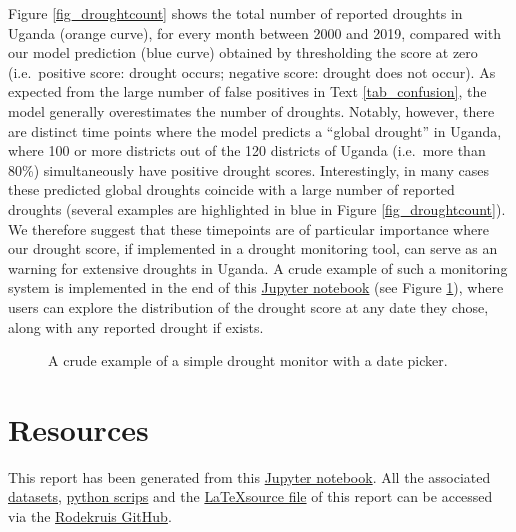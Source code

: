 \documentclass[10pt,parskip=half,
toc=sectionentrywithdots,
bibliography=totocnumbered,
captions=tableheading,numbers=noendperiod]{scrartcl}
\begin{document}
Figure \ref{fig_droughtcount} shows the total number of reported
droughts in Uganda (orange curve), for every month between 2000 and
2019, compared with our model prediction (blue curve) obtained by
thresholding the score at zero (i.e.~positive score: drought occurs;
negative score: drought does not occur). As expected from the large
number of false positives in Text \ref{tab_confusion}, the model
generally overestimates the number of droughts. Notably, however, there
are distinct time points where the model predicts a ``global drought''
in Uganda, where 100 or more districts out of the 120 districts of
Uganda (i.e.~more than 80\%) simultaneously have positive drought
scores. Interestingly, in many cases these predicted global droughts
coincide with a large number of reported droughts (several examples are
highlighted in blue in Figure \ref{fig_droughtcount}). We therefore
suggest that these timepoints are of particular importance where our
drought score, if implemented in a drought monitoring tool, can serve as
an warning for extensive droughts in Uganda. A crude example of such a
monitoring system is implemented in the end of this
\href{https://github.com/rodekruis/Drought_IBF/blob/master/Model\%20Event\%20Data/Uganda_logit_model.ipynb}{Jupyter
notebook} (see Figure \ref{fig_monitor}), where users can explore the
distribution of the drought score at any date they chose, along with any
reported drought if exists.

\begin{figure}[H]
\hypertarget{fig_monitor}{%
\begin{center}
\end{center}
\caption{A crude example of a simple drought monitor with a date picker.}\label{fig_monitor}
}
\end{figure}

\hypertarget{resources}{%
\section{Resources}\label{resources}}

This report has been generated from this
\href{https://github.com/rodekruis/Drought_IBF/blob/master/Model\%20Event\%20Data/Uganda_logit_model.ipynb}{Jupyter
notebook}. All the associated
\href{https://github.com/rodekruis/Drought_IBF/tree/master/Model\%20Event\%20Data/datasets}{datasets},
\href{https://github.com/rodekruis/Drought_IBF/blob/master/Model\%20Event\%20Data/drought_ibf_utility.py}{python
scrips} and the \href{}{\LaTeX source file} of this report can be
accessed via the
\href{https://github.com/rodekruis/Drought_IBF/tree/master/Model\%20Event\%20Data}{Rodekruis
GitHub}.
\end{document}
